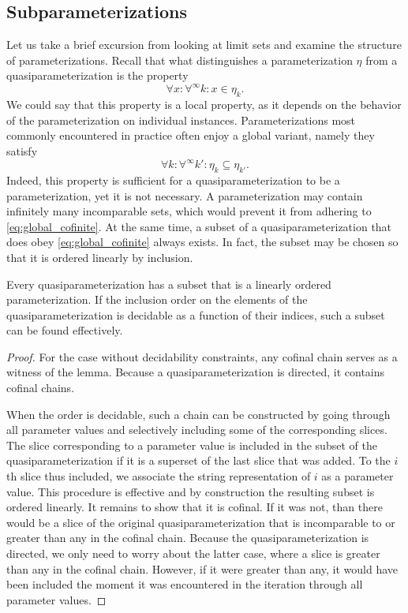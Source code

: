 \subsection{Subparameterizations}
Let us take a brief excursion from looking at limit sets and examine the structure of parameterizations.
Recall that what distinguishes a parameterization $\eta$ from a quasiparameterization is the property
\begin{equation*}
  \forall x\colon \forall^\infty k\colon x \in \eta_k.
\end{equation*}
We could say that this property is a local property, as it depends on the behavior of the parameterization on individual instances.
Parameterizations most commonly encountered in practice \parencite{niedermeier2006invitation} often enjoy a global variant, namely they satisfy
\begin{equation}
\label{eq:global_cofinite}
  \forall k\colon \forall^\infty k'\colon \eta_k \subseteq \eta_{k'}.
\end{equation}
Indeed, this property is sufficient for a quasiparameterization to be a parameterization, yet it is not necessary.
A parameterization may contain infinitely many incomparable sets, which would prevent it from adhering to \eqref{eq:global_cofinite}.
At the same time, a subset of a quasiparameterization that does obey \eqref{eq:global_cofinite} always exists.
In fact, the subset may be chosen so that it is ordered linearly by inclusion.
\begin{lemma}
\label{lem:cofinal_chain}
  Every quasiparameterization has a subset that is a linearly ordered parameterization.
  If the inclusion order on the elements of the quasiparameterization is decidable as a function of their indices, such a subset can be found effectively.
\end{lemma}
\begin{proof}
  For the case without decidability constraints, any cofinal chain \parencite{abramsky1994domain} serves as a witness of the lemma.
  Because a quasiparameterization is directed, it contains cofinal chains.

  When the order is decidable, such a chain can be constructed by going through all parameter values and selectively including some of the corresponding slices.
  The slice corresponding to a parameter value is included in the subset of the quasiparameterization if it is a superset of the last slice that was added.
  To the $i$th slice thus included, we associate the string representation of $i$ as a parameter value.
  This procedure is effective and by construction the resulting subset is ordered linearly.
  It remains to show that it is cofinal.
  If it was not, than there would be a slice of the original quasiparameterization that is incomparable to or greater than any in the cofinal chain.
  Because the quasiparameterization is directed, we only need to worry about the latter case, where a slice is greater than any in the cofinal chain.
  However, if it were greater than any, it would have been included the moment it was encountered in the iteration through all parameter values.
\end{proof}

